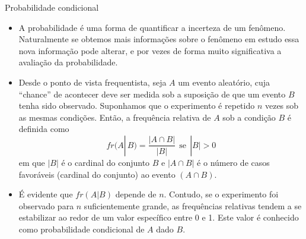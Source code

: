 \begin{frame}{Probabilidade condicional}
\vspace{1cm}
\begin{itemize}
 
\item A probabilidade é uma forma de quantificar a incerteza de um fenômeno. Naturalmente se obtemos mais informações sobre o fenômeno em estudo essa nova informação pode alterar,  e por vezes de forma muito significativa a avaliação da probabilidade. 


\item Desde o ponto de vista frequentista, seja $A$  um evento aleatório, cuja ``chance'' de acontecer deve ser medida sob a suposição de que um evento $B$ tenha sido observado. Suponhamos que o experimento é repetido $n$ vezes sob as mesmas condições. Então, a frequência relativa de $A$ sob a condição $B$ é definida como 
$$
fr(A|\,B)=\frac{|A \cap B|} {|B|} \ \ \text{se} \ \ |B| > 0 
$$
em que $|B|$ é o cardinal do conjunto $B$ e $|A \cap B |$ é o número de casos favoráveis (cardinal do conjunto) ao evento $(A \cap B).$ 

\item É evidente que  $fr(A|B)$ depende de $n$. Contudo, se o experimento foi  observado para $n$ suficientemente grande, as frequências relativas tendem a se estabilizar  ao redor de um valor específico entre 0 e 1. Este valor é conhecido como 
probabilidade condicional  de $A$ dado $B.$ 
\end{itemize}
\end{frame}

